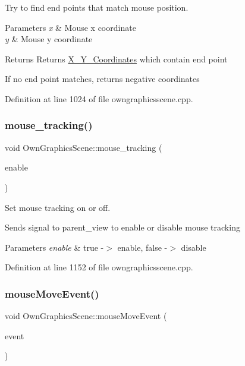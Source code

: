 Try to find end points that match mouse position. 


\begin{DoxyParams}{Parameters}
{\em x} & Mouse x coordinate \\
\hline
{\em y} & Mouse y coordinate \\
\hline
\end{DoxyParams}
\begin{DoxyReturn}{Returns}
Returns \mbox{\hyperlink{structX__Y__Coordinates}{X\+\_\+\+Y\+\_\+\+Coordinates}} which contain end point
\end{DoxyReturn}
If no end point matches, returns negative coordinates 

Definition at line 1024 of file owngraphicsscene.\+cpp.

\mbox{\label{classOwnGraphicsScene_adbcfda0bade866b7e5db29b7bfb53e0c}} 
\subsubsection{\texorpdfstring{mouse\+\_\+tracking()}{mouse\_tracking()}}
{\footnotesize\ttfamily void Own\+Graphics\+Scene\+::mouse\+\_\+tracking (\begin{DoxyParamCaption}\item[{bool}]{enable }\end{DoxyParamCaption})}



Set mouse tracking on or off. 

Sends signal to parent\+\_\+view to enable or disable mouse tracking 
\begin{DoxyParams}{Parameters}
{\em enable} & true -\/$>$ enable, false -\/$>$ disable \\
\hline
\end{DoxyParams}


Definition at line 1152 of file owngraphicsscene.\+cpp.

\mbox{\label{classOwnGraphicsScene_ac7f6be2800f09463413459fed74bf34e}} 
\subsubsection{\texorpdfstring{mouse\+Move\+Event()}{mouseMoveEvent()}}
{\footnotesize\ttfamily void Own\+Graphics\+Scene\+::mouse\+Move\+Event (\begin{DoxyParamCaption}\item[{Q\+Graphics\+Scene\+Mouse\+Event $\ast$}]{event }\end{DoxyParamCaption})}



